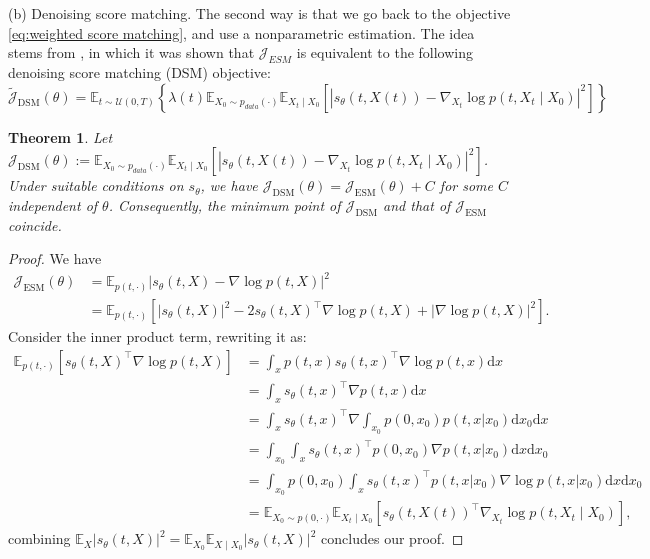 \documentclass[letterpaper,11pt,reqno]{amsart}
\newtheorem{theorem}{Theorem}[section]
\numberwithin{equation}{section}
\begin{document}
\medskip
(b) Denoising score matching. 
The second way is that we go back to the objective \eqref{eq:weighted score matching},
and use a nonparametric estimation.
The idea stems from \cite{Hyv05,Vi11},
in which it was shown that 
$\mathcal{J}_{ESM}$ is equivalent to the following denoising score matching (DSM) objective:
$$
\tilde{\mathcal{J}}_{\text{DSM}}(\theta)=\mathbb{E}_{t\sim\mathcal{U}(0, T)}\left\{\lambda(t) \mathbb{E}_{X_0\sim p_{data}(\cdot)} \mathbb{E}_{X_t \mid X_0}\left[\left|s_{\theta}(t,X(t))-\nabla_{X_t} \log p(t,X_t \mid X_0)\right|^2\right]\right\}
$$

\begin{theorem}
\label{thm:DSM}
Let 
$\mathcal{J}_{\text{DSM}}(\theta):= \mathbb{E}_{X_0\sim p_{data}(\cdot)} \mathbb{E}_{X_t \mid X_0}\left[\left|s_{\theta}(t,X(t))-\nabla_{X_t} \log p(t,X_t \mid X_0)\right|^2\right]$.
Under suitable conditions on $s_\theta$, we have 
$\mathcal{J}_{\text{DSM}}(\theta) = \mathcal{J}_{\text{ESM}}(\theta) + C$ for some $C$ independent of $\theta$. 
Consequently, the minimum point of $\mathcal{J}_{\text{DSM}}$ and that of $\mathcal{J}_{\text{ESM}}$ coincide. 
\end{theorem}
\begin{proof}
We have 
\begin{equation*}
\begin{aligned}
\mathcal{J}_{\text{ESM}}(\theta) 
& = \mathbb{E}_{p(t, \cdot)} |s_\theta(t,X) - \nabla \log p(t,X)|^2\\
& = \mathbb{E}_{p(t, \cdot)} \left[|s_\theta(t,X)|^2 - 2 s_\theta(t,X)^{\top}\nabla \log p(t,X)+|\nabla \log p(t,X)|^2\right].
\end{aligned}
\end{equation*}
Consider the inner product term, rewriting it as:
\begin{equation*}
\begin{aligned}
\mathbb{E}_{p(t, \cdot)} \left[s_\theta(t,X)^{\top}\nabla \log p(t,X)\right]& = \int_{x}p(t,x)s_\theta(t,x)^{\top}\nabla \log p(t,x) \mathrm{d}x\\
& = \int_{x}s_\theta(t,x)^{\top}\nabla p(t,x) \mathrm{d}x\\
& = \int_{x}
s_\theta(t,x)^{\top}\nabla 
\int_{x_0}p(0,x_0)p(t,x|x_0)\mathrm{d}x_0 \mathrm{d}x\\
& = \int_{x_0}\int_{x}
s_\theta(t,x)^{\top} 
p(0,x_0)\nabla p(t,x|x_0)\mathrm{d}x\mathrm{d}x_0 \\
& = \int_{x_0}p(0,x_0)\int_{x}
s_\theta(t,x)^{\top} 
p(t,x|x_0) \nabla \log p(t,x|x_0)\mathrm{d}x\mathrm{d}x_0\\
& = \mathbb{E}_{X_0\sim p(0,\cdot)} \mathbb{E}_{X_t \mid X_0} \left[s_{\theta}(t,X(t))^{\top}\nabla_{X_t} \log p(t,X_t \mid X_0)\right],
\end{aligned}
\end{equation*}
combining $\mathbb{E}_{X} |s_\theta(t,X)|^2=\mathbb{E}_{X_0} \mathbb{E}_{X \mid X_0}|s_\theta(t,X)|^2$ concludes our proof.
\end{proof}
\end{document}
